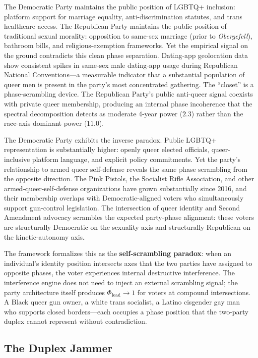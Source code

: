 The Democratic Party maintains the public position of LGBTQ+ inclusion: platform support for marriage equality, anti-discrimination statutes, and trans healthcare access. The Republican Party maintains the public position of traditional sexual morality: opposition to same-sex marriage (prior to \textit{Obergefell}), bathroom bills, and religious-exemption frameworks. Yet the empirical signal on the ground contradicts this clean phase separation. Dating-app geolocation data show consistent spikes in same-sex male dating-app usage during Republican National Conventions---a measurable indicator that a substantial population of queer men is present in the party's most concentrated gathering. The ``closet'' is a phase-scrambling device. The Republican Party's public anti-queer signal coexists with private queer membership, producing an internal phase incoherence that the spectral decomposition detects as moderate 4-year power ($2.3$) rather than the race-axis dominant power ($11.0$).

The Democratic Party exhibits the inverse paradox. Public LGBTQ+ representation is substantially higher: openly queer elected officials, queer-inclusive platform language, and explicit policy commitments. Yet the party's relationship to armed queer self-defense reveals the same phase scrambling from the opposite direction. The Pink Pistols, the Socialist Rifle Association, and other armed-queer-self-defense organizations have grown substantially since 2016, and their membership overlaps with Democratic-aligned voters who simultaneously support gun-control legislation. The intersection of queer identity and Second Amendment advocacy scrambles the expected party-phase alignment: these voters are structurally Democratic on the sexuality axis and structurally Republican on the kinetic-autonomy axis.

The framework formalizes this as the \textbf{self-scrambling paradox}: when an individual's identity position intersects axes that the two parties have assigned to opposite phases, the voter experiences internal destructive interference. The interference engine does not need to inject an external scrambling signal; the party architecture itself produces $\Phi_{\text{load}} \to 1$ for voters at compound intersections. A Black queer gun owner, a white trans socialist, a Latino cisgender gay man who supports closed borders---each occupies a phase position that the two-party duplex cannot represent without contradiction.

\subsection{The Duplex Jammer}
\label{sec:duplex_jammer}

